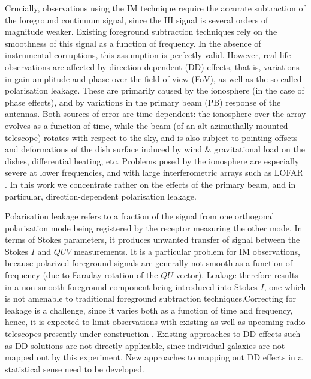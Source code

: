 \documentclass[fleqn,usenatbib]{mnras}
\begin{document}
Crucially, observations using the IM technique require the accurate subtraction of the foreground continuum signal, since the HI signal is several orders of magnitude weaker.
Existing foreground subtraction techniques rely on the smoothness of this signal as a function of frequency. In the absence of instrumental 
corruptions, this assumption is perfectly valid. However, real-life observations are affected by direction-dependent (DD) effects, that is, variations in gain
amplitude and phase over the field of view (FoV), as well as the so-called polarisation leakage. These are primarily caused by the ionosphere (in the case of 
phase effects), and by variations in the primary beam (PB) response of the antennas. Both sources of error are time-dependent: the ionosphere over the array 
evolves as a function of time, while the beam (of an alt-azimuthally mounted telescope) rotates with respect to the sky, and is also subject to pointing offsets and 
deformations of the dish surface induced by wind \& gravitational load on the dishes, differential heating, etc. Problems posed by the ionosphere are especially severe 
at lower frequencies, and with large interferometric arrays such as LOFAR \citep{2013A&A...556A...2V,2010ISPM...27...30W}. In this work we concentrate rather on the effects of the primary 
beam, and in particular, direction-dependent polarisation leakage. 

Polarisation leakage refers to a fraction of the signal from one orthogonal polarisation mode being registered by the receptor measuring the other mode. 
In terms of Stokes parameters, it produces unwanted transfer of signal between the Stokes $I$ and $QUV$ measurements. It is a particular problem for IM observations,
because polarized foreground signals are generally not smooth as a function of frequency (due to Faraday rotation of the $QU$ vector). Leakage therefore results in a
non-smooth foreground component being introduced into Stokes $I$, one which is not amenable to traditional foreground subtraction techniques.Correcting for leakage is a
challenge, since it varies both as a function of time and frequency, hence, it is expected to limit observations  with  existing  as  well  as  upcoming radio telescopes
presently under construction \citep{2008A&A...487..419B}.  Existing approaches to DD effects such as DD solutions \citep{2011A&A...527A.106S} are not directly applicable,
since individual galaxies are not mapped out by this experiment. New approaches to mapping out DD effects in a statistical sense need to be developed. 
\end{document}
